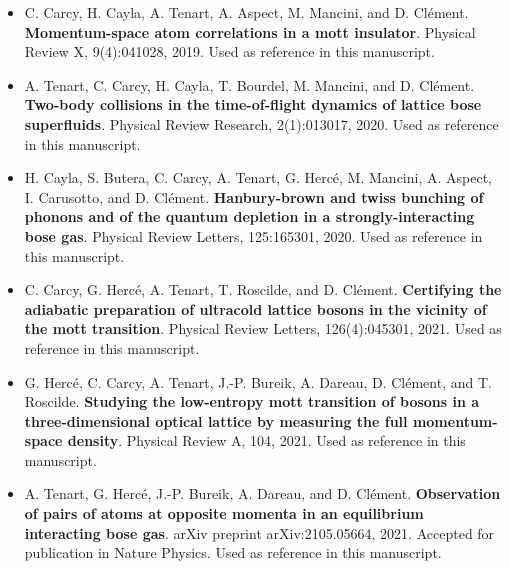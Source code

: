 \documentclass[a4paper, 11pt,twoside,openright]{book}
\begin{document}
\begin{itemize}
    \item C. Carcy, H. Cayla, A. Tenart, A. Aspect, M. Mancini, and D. Clément. \textbf{Momentum-space atom correlations in a mott insulator}. Physical Review X, 9(4):041028, 2019. Used as reference \cite{carcy2019momentum} in this manuscript.
    \vspace{0.5cm}
    \item A. Tenart, C. Carcy, H. Cayla, T. Bourdel, M. Mancini, and D. Clément. \textbf{Two-body collisions in the time-of-flight dynamics of lattice bose superfluids}. Physical Review Research, 2(1):013017, 2020. Used as reference \cite{tenart2020two} in this manuscript.
    \vspace{0.5cm}
    \item H. Cayla, S. Butera, C. Carcy, A. Tenart, G. Hercé, M. Mancini, A. Aspect, I. Carusotto, and D. Clément. \textbf{ Hanbury-brown and twiss bunching of phonons and of the quantum depletion in a strongly-interacting bose gas}. Physical Review Letters, 125:165301, 2020. Used as reference \cite{cayla2020} in this manuscript.
    \vspace{0.5cm}
    \item C. Carcy, G. Hercé, A. Tenart, T. Roscilde, and D. Clément. \textbf{Certifying the adiabatic preparation of ultracold lattice bosons in the vicinity of the mott transition}. Physical Review Letters, 126(4):045301, 2021. Used as reference \cite{carcy2021} in this manuscript.
    \vspace{0.5cm}
    \item G. Hercé, C. Carcy, A. Tenart, J.-P. Bureik, A. Dareau, D. Clément, and T. Roscilde. \textbf{Studying the low-entropy mott transition of bosons in a three-dimensional optical lattice by measuring the full momentum-space density}. Physical Review A, 104, 2021. Used as reference \cite{carcy2021studying} in this manuscript.
    \vspace{0.5cm}
    \item A. Tenart, G. Hercé, J.-P. Bureik, A. Dareau, and D. Clément. \textbf{Observation of pairs of atoms at opposite momenta in an equilibrium interacting bose gas}. arXiv preprint arXiv:2105.05664, 2021. Accepted for publication in Nature Physics. Used as reference \cite{tenart2021observation} in this manuscript. 
\end{itemize}




\setlength{\parskip}{\parskipinitial}





\end{document}
